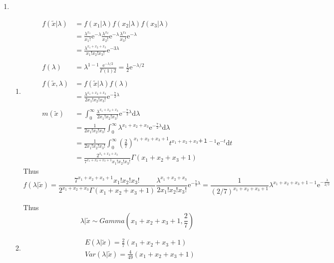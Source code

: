 \documentclass{article}
\begin{document}
\begin{enumerate}[leftmargin = 0 em, label = \arabic*., font = \bfseries]
 	 	\item 
 	 	\begin{enumerate}
 	 		\item 
 	 	\begin{align*}
 	 	f(\tilde{x}|\lambda) & = f(x_1 | \lambda) f(x_2 | \lambda) f(x_3 | \lambda)\\
 	 	& = \frac{\lambda^{x_1}}{x_1 !} \mathrm{e}^{- \lambda} \frac{\lambda^{x_2}}{x_2 !} \mathrm{e}^{- \lambda} \frac{\lambda^{x_3}}{x_3 !} \mathrm{e}^{- \lambda}\\
 	 	& = \frac{\lambda^{x_1 + x_2 + x_3}}{x_1 ! x_2 ! x_3 !} \mathrm{e}^{- 3 \lambda}\\
 	 	&\\
		f(\lambda) & =  \lambda^{1-1} \frac{\mathrm{e}^{- \lambda / 2}}{\Gamma(1) 2} = \frac{1}{2} \mathrm{e}^{- \lambda / 2}\\
		&\\
		f(\tilde{x}, \lambda) &= f(\tilde{x}|\lambda)f(\lambda)\\
		& = \frac{\lambda^{x_1 + x_2 + x_3}}{2 x_1 ! x_2! x_3!} \mathrm{e}^{-\frac{7}{2}\lambda}\\
		&\\
		m(\tilde{x})& = \int_{0}^\infty \frac{\lambda^{x_1 + x_2 + x_3}}{2 x_1 ! x_2 ! x_3 !} \mathrm{e}^{- \frac{7}{2}\lambda} \mathrm{d}\lambda\\
		& = \frac{1}{2 x_1 ! x_2 ! x_3 !} \int_{0}^\infty \lambda^{x_1 + x_2 + x_3} \mathrm{e}^{-\frac{7}{2} \lambda} \mathrm{d}\lambda\\
		& = \frac{1}{2 x_1 ! x_2 ! x_3 !} \int_{0}^\infty (\frac{2}{7})^{x_1 + x_2 + x_3 + 1} t^{x_1 + x_2 + x_3 ＋１ - 1} \mathrm{e}^{-t}\mathrm{d}t\\
		& = \frac{2^{x_1 + x_2 + x_3}}{7^{x_1 + x_2 + x_3 + 1} x_1 ! x_2 ! x_3 !} \Gamma(x_1 + x_2 + x_3 + 1) 
 	 	\end{align*}
 	 	Thus
 	 	\[f(\lambda | \tilde{x}) = \frac{7^{x_1 + x_2 + x_3 + 1} x_1!x_2 !x_3!}{2^{x_1 + x_2 + x_3 } \Gamma(x_1 + x_2 + x_3 + 1)} \frac{\lambda^{x_1 + x_2 + x_3}}{2 x_1 ! x_2 ! x_3 !} \mathrm{e}^{- \frac{7}{2}\lambda} = \frac{1}{(2/7)^{x_1 + x_2 + x_3 + 1}} \lambda^{x_1 + x_2 + x_3 + 1 -1} \mathrm{e}^{-\frac{\lambda}{2/7}}\]

 	 	Thus 
 	 	\[\lambda | \tilde{x} \sim Gamma(x_1 + x_2 + x_3  + 1, \frac{2}{7})\]

 	 	\item 
 	 	\begin{align*}
 	 	& E(\lambda| \tilde{x}) = \frac{2}{7} (x_1 + x_2 + x_3 + 1)\\
 	 	& Var(\lambda | \tilde{x}) = \frac{4}{49}(x_1 + x_2 + x_3 + 1)
 	 	\end{align*}
 	 	

\end{enumerate}
\end{enumerate}
\end{document}
